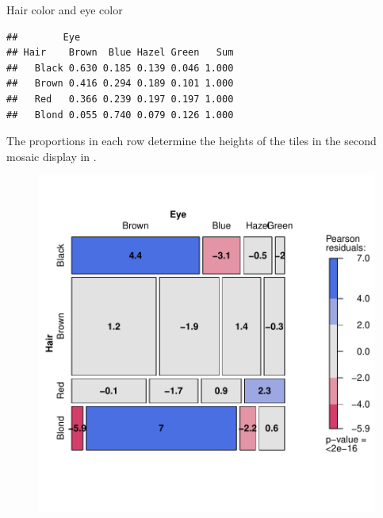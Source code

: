 \documentclass[11pt]{book}
\renewenvironment{knitrout}{\small\renewcommand{\baselinestretch}{.85}}{} %
\begin{document}
\begin{Example}[haireye2a]{Hair color and eye color}
\begin{knitrout}
\color{fgcolor}\begin{kframe}
\begin{alltt}
\hlstd{(}\hlstd{(} \hlstd{),} \hlstd{),} \hlstd{)}
\end{alltt}
\begin{verbatim}
##        Eye
## Hair    Brown  Blue Hazel Green   Sum
##   Black 0.630 0.185 0.139 0.046 1.000
##   Brown 0.416 0.294 0.189 0.101 1.000
##   Red   0.366 0.239 0.197 0.197 1.000
##   Blond 0.055 0.740 0.079 0.126 1.000
\end{verbatim}
\end{kframe}
\end{knitrout}
The proportions in each row determine the heights of the tiles in the second mosaic display in .

\begin{knitrout}
\color{fgcolor}\begin{kframe}
\begin{alltt}
  \hlstd{=}\hlstd{,} \hlstd{=}\hlstd{,}
         \hlstd{=}\hlstd{(}\hlstd{=}\hlstd{))}
\end{alltt}
\end{kframe}\begin{figure}[!htbp]


\centerline{\includegraphics[width=.6\textwidth]{ch05/fig/haireye-mos8} }


\end{figure}
\end{knitrout}
\end{Example}
\end{document}
